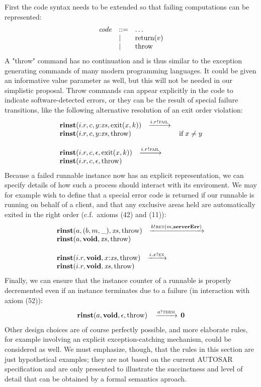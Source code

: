 \documentclass[10pt,conference]{IEEEtran}
\begin{document}
First the code syntax needs to be extended so that failing computations can be represented:
$$
\begin{array}{lll}
  \Code & ::= & \ldots               \\
        & |   & \Return v            \\
        & |   & \Throw
\end{array}
$$
A "throw" command has no continuation and is thus similar to the exception generating commands of many modern programming languages. It could be given an informative value parameter as well, but this will not be needed in our simplistic proposal. Throw commands can appear explicitly in the code to indicate software-detected errors, or they can be the result of special failure transitions, like the following alternative resolution of an exit order violation:
$$
\begin{array}{lcll}
		{\Trinst {i.r} c {\Tcons y \Xs} {\TrteExit x k}}
		\;\; \red {\Tsay {i.r} \Tfail} \\
		{\Trinst {i.r} c {\Tcons y \Xs} \Throw}
		& \Pif\;x \neq y
\\ \\
		{\Trinst {i.r} c \Teps {\TrteExit x k}}
		\;\; \red {\Tsay {i.r} \Tfail}  \\
		{\Trinst {i.r} c \Teps \Throw}
\end{array}
$$
Because a failed runnable instance now has an explicit representation, we can specify details of how such a process should interact with its enviroment. We may for example wish to define that a special error code is returned if our runnable is running on behalf of a client, and that any exclusive areas held are automatically exited in the right order (c.f.~axioms (42) and (11)):
$$
\begin{array}{lcll}
		{\Trinst a {\Tclient b m \_} \Xs \Throw}
		\;\; \red{\Tsay b {\Tret m {\kw{serverErr}}}} \\
		{\Trinst a \Tvoid \Xs \Throw}
\\ \\
		{\Trinst {i.r} \Tvoid {\Tcons x \Xs} \Throw}
		\;\; \red{\Tsay {i.x} \Tex} \\
		{\Trinst {i.r} \Tvoid \Xs \Throw}
\end{array}
$$
Finally, we can ensure that the instance counter of a runnable is properly decremented even if an instance terminates due to a failure (in interaction with axiom (52)):
$$
\begin{array}{rcll}
		{\textbf{rinst}(a,\textbf{void},\epsilon,\text{throw})}
		& \,\xrightarrow{a \mspace{1mu}!\mspace{1mu} \textsc{term}}\,
		\textbf{0}
\end{array}
$$
Other design choices are of course perfectly possible, and more elaborate rules, for example involving an explicit exception-catching mechanism, could be considered as well. We must emphasize, though, that the rules in this section are just hypothetical examples; they are not based on the current AUTOSAR specification and are only presented to illustrate the succinctness and level of detail that can be obtained by a formal semantics aproach.
\end{document}
